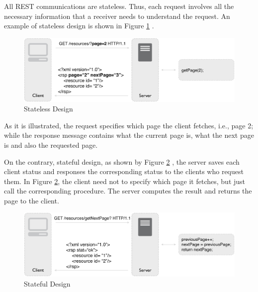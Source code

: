 All REST communications are stateless. Thus, each request involves all the necessary information that a receiver needs to understand the request. An example of stateless design is shown in Figure \ref{fig:stateless-design} \cite{rodriguez2008restful}.

\begin{figure}[t]
  \begin{center}
    \includegraphics[width=1\textwidth]{images/stateless-design.pdf}
    \caption{Stateless Design \cite{rodriguez2008restful}}
    \label{fig:stateless-design}
  \end{center}
\end{figure}

As it is illustrated, the request specifies which page the client fetches, i.e., page 2; while the response message contains what the current page is, what the next page is and also the requested page.

On the contrary, stateful design, as shown by Figure \ref{fig:stateful-design} \cite{rodriguez2008restful}, the server saves each client status and responses the corresponding status to the clients who request them. In Figure \ref{fig:stateful-design}, the client need not to specify which page it fetches, but just call the corresponding procedure. The server computes the result and returns the page to the client.

\begin{figure}[t]
  \begin{center}
    \includegraphics[width=1\textwidth]{images/stateful-design.pdf}
    \caption{Stateful Design \cite{rodriguez2008restful}}
    \label{fig:stateful-design}
  \end{center}
\end{figure}

